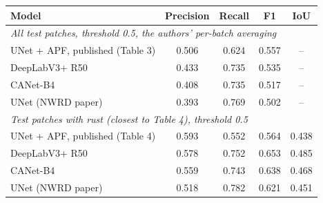 \begin{tabular}{lcccc}
\toprule
Model & Precision & Recall & F1 & IoU \\
\midrule
\multicolumn{5}{l}{\emph{All test patches, threshold 0.5, the authors' per-batch averaging}} \\
UNet + APF, published (Table 3) & 0.506 & 0.624 & 0.557 & -- \\
DeepLabV3+ R50 & 0.433 & 0.735 & 0.535 & -- \\
CANet-B4 & 0.408 & 0.735 & 0.517 & -- \\
UNet (NWRD paper) & 0.393 & 0.769 & 0.502 & -- \\
\midrule
\multicolumn{5}{l}{\emph{Test patches with rust (closest to Table 4), threshold 0.5}} \\
UNet + APF, published (Table 4) & 0.593 & 0.552 & 0.564 & 0.438 \\
DeepLabV3+ R50 & 0.578 & 0.752 & 0.653 & 0.485 \\
CANet-B4 & 0.559 & 0.743 & 0.638 & 0.468 \\
UNet (NWRD paper) & 0.518 & 0.782 & 0.621 & 0.451 \\
\bottomrule
\end{tabular}
